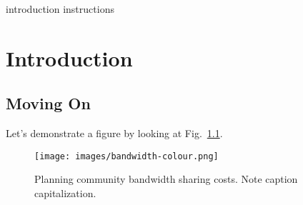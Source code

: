 introduction instructions
\chapter{Introduction}

\section{Moving On}
Let's demonstrate a figure by looking at Fig.~\ref{bandwidth}. 

\begin{figure}[!h]
\centering 
\texttt{[image: images/bandwidth-colour.png]}
\caption{Planning community bandwidth sharing costs. 
  Note caption capitalization.}
\label{bandwidth} 
\end{figure}









